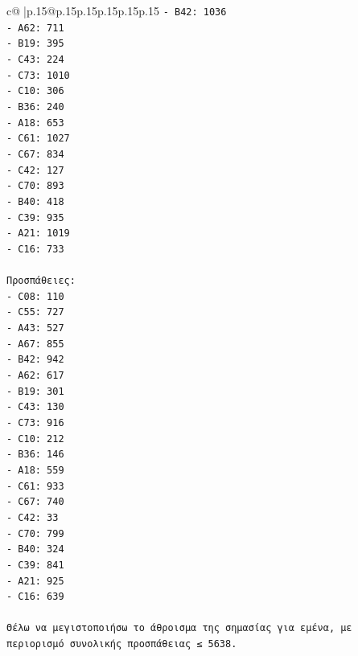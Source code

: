\documentclass{article}
\begin{document}
{\begin{supertabular}{c@{$\;$}|p{.15\linewidth}@{}p{.15\linewidth}p{.15\linewidth}p{.15\linewidth}p{.15\linewidth}p{.15\linewidth}}
{{{\texttt{{-} B42: 1036} \\
\texttt{{-} A62: 711} \\
\texttt{{-} B19: 395} \\
\texttt{{-} C43: 224} \\
\texttt{{-} C73: 1010} \\
\texttt{{-} C10: 306} \\
\texttt{{-} B36: 240} \\
\texttt{{-} A18: 653} \\
\texttt{{-} C61: 1027} \\
\texttt{{-} C67: 834} \\
\texttt{{-} C42: 127} \\
\texttt{{-} C70: 893} \\
\texttt{{-} B40: 418} \\
\texttt{{-} C39: 935} \\
\texttt{{-} A21: 1019} \\
\texttt{{-} C16: 733} \\
\\ 
\texttt{Προσπάθειες:} \\
\texttt{{-} C08: 110} \\
\texttt{{-} C55: 727} \\
\texttt{{-} A43: 527} \\
\texttt{{-} A67: 855} \\
\texttt{{-} B42: 942} \\
\texttt{{-} A62: 617} \\
\texttt{{-} B19: 301} \\
\texttt{{-} C43: 130} \\
\texttt{{-} C73: 916} \\
\texttt{{-} C10: 212} \\
\texttt{{-} B36: 146} \\
\texttt{{-} A18: 559} \\
\texttt{{-} C61: 933} \\
\texttt{{-} C67: 740} \\
\texttt{{-} C42: 33} \\
\texttt{{-} C70: 799} \\
\texttt{{-} B40: 324} \\
\texttt{{-} C39: 841} \\
\texttt{{-} A21: 925} \\
\texttt{{-} C16: 639} \\
\\ 
\texttt{Θέλω να μεγιστοποιήσω το άθροισμα της σημασίας για εμένα, με περιορισμό συνολικής προσπάθειας ≤ 5638.} \\
}}}
\end{supertabular}}
\end{document}
